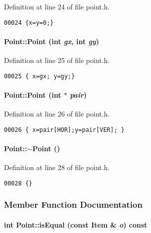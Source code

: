 Definition at line 24 of file point.h.\small\begin{verbatim}00024 {x=y=0;}
\end{verbatim}\normalsize 
\label{Point_a1}
\paragraph{\setlength{\rightskip}{0pt plus 5cm}Point::Point (int {\em gx}, int {\em gy})\hspace{0.3cm}{\tt  [inline]}}\hfill



Definition at line 25 of file point.h.\small\begin{verbatim}00025 { x=gx; y=gy;}
\end{verbatim}\normalsize 
\label{Point_a2}
\paragraph{\setlength{\rightskip}{0pt plus 5cm}Point::Point (int $\ast$ {\em pair})\hspace{0.3cm}{\tt  [inline]}}\hfill



Definition at line 26 of file point.h.\small\begin{verbatim}00026 { x=pair[HOR];y=pair[VER]; }
\end{verbatim}\normalsize 
\label{Point_a3}
\paragraph{\setlength{\rightskip}{0pt plus 5cm}Point::$\sim$Point ()\hspace{0.3cm}{\tt  [inline]}}\hfill



Definition at line 28 of file point.h.\small\begin{verbatim}00028 {}
\end{verbatim}\normalsize 


\subsubsection{Member Function Documentation}
\label{Point_a7}
\paragraph{\setlength{\rightskip}{0pt plus 5cm}int Point::is\-Equal (const {\bf Item} \& {\em o}) const\hspace{0.3cm}{\tt  [inline, virtual]}}\hfill



